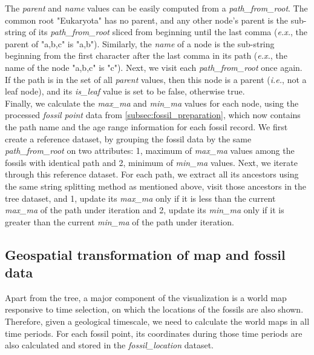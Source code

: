 \documentclass[11pt, a4paper,oneside,chapterprefix=false]{scrbook}
\begin{document}
The \emph{parent} and \emph{name} values can be easily computed from a \emph{path\_from\_root}. The common root "Eukaryota" has no parent, and any other node's parent is the sub-string of its \emph{path\_from\_root} sliced from beginning until the last comma (\emph{e.x.}, the parent of "a,b,c" is "a,b"). Similarly, the \emph{name} of a node is the sub-string beginning from the first character after the last comma in its path (\emph{e.x.}, the name of the node "a,b,c" is "c"). Next, we visit each \emph{path\_from\_root} once again. If the path is in the set of all \emph{parent} values, then this node is a parent (\emph{i.e.}, not a leaf node), and its \emph{is\_leaf} value is set to be false, otherwise true. \\

Finally, we calculate the \emph{max\_ma} and \emph{min\_ma} values for each node, using the processed \emph{fossil point} data from \ref{subsec:fossil_preparation}, which now contains the path name and the age range information for each fossil record. We first create a reference dataset, by grouping the fossil data by the same \emph{path\_from\_root} on two attributes: 1, maximum of \emph{max\_ma} values among the fossils with identical path and 2, minimum of \emph{min\_ma} values. Next, we iterate through this reference dataset. For each path, we extract all its ancestors using the same string splitting method as mentioned above, visit those ancestors in the tree dataset, and 1, update its \emph{max\_ma} only if it is less than the current \emph{max\_ma} of the path under iteration and 2, update its \emph{min\_ma} only if it is greater than the current \emph{min\_ma} of the path under iteration.

\subsection{Geospatial transformation of map and fossil data} \label{subsec:geospatial_transformation}
Apart from the tree, a major component of the visualization is a world map responsive to time selection, on which the locations of the fossils are also shown. Therefore, given a geological timescale, we need to calculate the world maps in all time periods. For each fossil point, its coordinates during those time periods are also calculated and stored in the \emph{fossil\_location} dataset. \\
\end{document}
